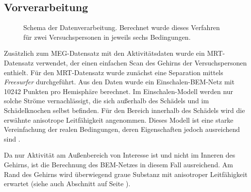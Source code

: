 \documentclass[doc,a4paper,12pt]{apa6}
\makeatletter
\DeclareRobustCommand*{\nameref}[1]{%
      \glqq{\myorg@nameref{#1}}\grqq%
    }%
\makeatother
\begin{document}
\subsection{Vorverarbeitung}

\begin{figure}
  \centering
  \setlength{\fboxsep}{5mm}
  \vspace*{3mm}
  \caption[Schema der Datenverarbeitung]{Schema der Datenverarbeitung. Berechnet wurde dieses Verfahren für zwei Versuchspersonen in jeweils sechs Bedingungen.}
  \label{img:verfahren}
\end{figure}

Zusätzlich zum MEG-Datensatz mit den Aktivitätsdaten wurde ein MRT-Datensatz verwendet, der einen einfachen Scan des Gehirns der Versuchspersonen enthielt. Für den MRT-Datensatz wurde zunächst eine Separation mittels \emph{Freesurfer} durchgeführt. Aus den Daten wurde ein Einschalen-BEM-Netz mit 10242 Punkten pro Hemisphäre berechnet. Im Einschalen-Modell werden nur solche Ströme vernachlässigt, die sich außerhalb des Schädels und im Schädelknochen selbst befinden. Für den Bereich innerhalb des Schädels wird die erwähnte anisotrope Leitfähigkeit angenommen. Dieses Modell ist eine starke Vereinfachung der realen Bedingungen, deren Eigenschaften jedoch ausreichend sind \parencite{stenroos2014comparison}.

Da nur Aktivität am Außenbereich von Interesse ist und nicht im Inneren des Gehirns, ist die Berechnung des BEM-Netzes in diesem Fall ausreichend. Am Rand des Gehirns wird überwiegend graue Substanz mit anisotroper Leitfähigkeit erwartet (siehe auch Abschnitt \nameref{sec:segment} auf Seite \pageref{sec:segment}).
\end{document}
